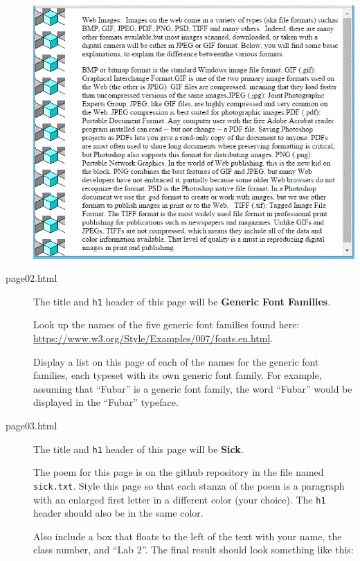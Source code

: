 \documentclass{article}
\begin{document}
\begin{description}
  \includegraphics[scale=0.5]{page.png}

\item[page02.html]
  The title and {\tt h1} header of this page will be {\bf Generic Font
    Families}. 

  Look up the names of the five generic font families found here:
  \url{https://www.w3.org/Style/Examples/007/fonts.en.html}.

  Display a list on this page of each of the names for the generic
  font families, each typeset with its own generic font family.  For
  example, assuming that ``Fubar'' is a generic font family, the word
  ``Fubar'' would be displayed in the ``Fubar'' typeface.

\item[page03.html]

    The title and {\tt h1} header of this page will be
  {\bf Sick}.

  The poem for this page is on the github repository in the file named
  {\tt sick.txt}.  Style this page so that each stanza of the poem is
  a paragraph with an enlarged first letter in a different color (your
  choice).  The {\tt h1} header should also be in the same color.

  Also include a box that floats to the left of the text with your
  name, the class number, and ``Lab 2''.  The final result should look
  something like this:


\end{description}
\end{document}
